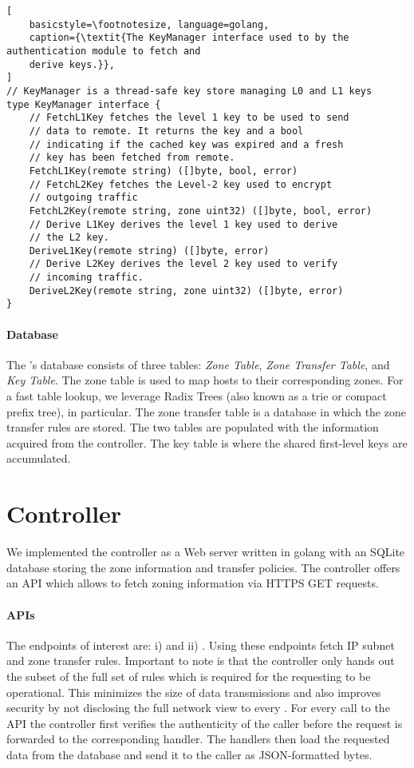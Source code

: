 \begin{lstlisting}[
	basicstyle=\footnotesize, language=golang,
	caption={\textit{The KeyManager interface used to by the authentication module to fetch and
	derive keys.}},
]
// KeyManager is a thread-safe key store managing L0 and L1 keys
type KeyManager interface {
	// FetchL1Key fetches the level 1 key to be used to send
	// data to remote. It returns the key and a bool
	// indicating if the cached key was expired and a fresh
	// key has been fetched from remote.
	FetchL1Key(remote string) ([]byte, bool, error)
	// FetchL2Key fetches the Level-2 key used to encrypt
	// outgoing traffic
	FetchL2Key(remote string, zone uint32) ([]byte, bool, error)
	// Derive L1Key derives the level 1 key used to derive
	// the L2 key.
	DeriveL1Key(remote string) ([]byte, error)
	// Derive L2Key derives the level 2 key used to verify
	// incoming traffic.
	DeriveL2Key(remote string, zone uint32) ([]byte, error)
}
\end{lstlisting}

\paragraph{Database}
The \tp's database consists of three tables: \textit{Zone Table}, \textit{Zone Transfer
	Table}, and \textit{Key Table}. The zone table is used to map hosts to their corresponding
zones. For a fast table lookup, we leverage Radix Trees (also known as a trie or compact prefix
tree),  in particular. The zone transfer table is a database
in which the zone transfer rules are stored. The two tables are populated with the information
acquired from the controller. The key table is where the shared first-level keys are
accumulated.

\section{Controller}
\label{sec:controller}

We implemented the controller as a Web server written in golang with an SQLite database storing the
zone information and transfer policies. The controller offers an API which allows
\tps to fetch zoning information via HTTPS GET requests.

\paragraph{APIs}
The endpoints of interest are: i)  and ii) .
Using these endpoints \tps fetch IP subnet and zone transfer rules. Important to note is that
the controller only hands out the subset of the full set of rules which is required for the
requesting \tp to be operational. This minimizes the size of data transmissions and also
improves security by not disclosing the full network view to every \tp. For every call to the
API the controller first verifies the authenticity of the caller before the request is forwarded
to the corresponding handler. The handlers then load the requested data from the database and
send it to the caller as JSON-formatted bytes.

